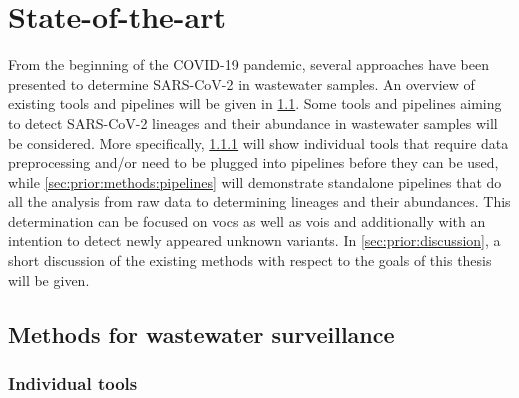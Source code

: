 %
\section{State-of-the-art}

From the beginning of the COVID-19 pandemic, several approaches have been presented to determine SARS-CoV-2 in wastewater samples. An overview of existing tools and pipelines will be given in \cref{sec:prior:methods}. Some tools and pipelines aiming to detect SARS-CoV-2 lineages and their abundance in wastewater samples will be considered. More specifically, \cref{sec:prior:methods:tools} will show individual tools that require data preprocessing and/or need to be plugged into pipelines before they can be used, while \cref{sec:prior:methods:pipelines} will demonstrate standalone pipelines that do all the analysis from raw data to determining lineages and their abundances. This determination can be focused on \acrfull{vocs} as well as \acrfull{vois} and additionally with an intention to detect newly appeared unknown variants. In \cref{sec:prior:discussion}, a short discussion of the existing methods with respect to the goals of this thesis will be given.

    \subsection{Methods for wastewater surveillance} \label{sec:prior:methods}
    
        \subsubsection{Individual tools} \label{sec:prior:methods:tools}

